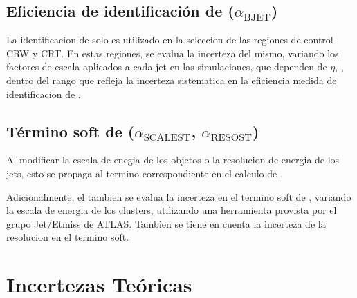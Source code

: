 \subsection{Eficiencia de identificación de {\bjets} ($\alpha_\text{BJET}$)}

La identificacion de {\bjets} solo es utilizado en la seleccion de las regiones de control CRW y CRT.
En estas regiones, se evalua la incerteza del mismo, variando los factores de escala
aplicados a cada jet en las simulaciones, que dependen de $\eta$, {\pt}, dentro del rango
que refleja la incerteza sistematica en la eficiencia medida de identificacion de {\bjets}.




\subsection{Término soft de \MET ($\alpha_\text{SCALEST}$, $\alpha_\text{RESOST}$)}

Al modificar la escala de enegia de los objetos o la resolucion de energia de los jets, esto
se propaga al termino correspondiente en el calculo de {\met}.

Adicionalmente, el tambien se evalua la incerteza en el termino soft de {\met}, variando
la escala de energia de los clusters, utilizando una herramienta provista por
el grupo Jet/Etmiss de ATLAS. %
Tambien se tiene en cuenta la incerteza de la resolucion en el termino soft.





\section{Incertezas Teóricas}\label{sec:theosyst}



